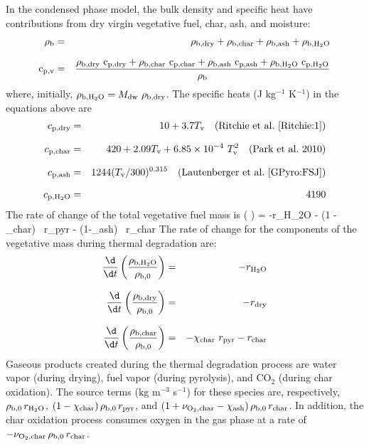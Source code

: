 \documentclass[11pt]{book}
\begin{document}
In the condensed phase model, the bulk density and specific heat have contributions from dry virgin vegetative fuel, char, ash, and moisture:
\begin{eqnarray}
\rho_{\rm b} &=& \rho_{\rm b,dry} + \rho_{\rm b,char} + \rho_{\rm b,ash} + \rho_{\rm b,H_2O} \\[.1in]
{\rm c_{\rm p,v}} &=& \frac{\rho_{\rm b,dry}\ {\rm c_{p,dry}} + \rho_{\rm b,char}\ {\rm c_{p,char}} + \rho_{\rm b,ash}\ {\rm c_{p,ash}} + \rho_{\rm b,H_2O}\ {\rm c_{p,H_2O}}}{\rho_{\rm b}}
\end{eqnarray}
where, initially, $\rho_{\rm b,H_2O} = M_{\rm dw}\ \rho_{\rm b, dry}$. The specific heats (J kg$^{-1}$ K$^{-1}$) in the equations above are
\begin{eqnarray}
c_{\rm p, dry} &=& 10 + 3.7T_{\rm v}~~~ ({\rm Ritchie~et~al.~\cite{Ritchie:1}})  \\[.1in]
c_{\rm p, char} &=& 420 + 2.09 T_{\rm v} + 6.85 \times 10^{-4}\ T^2_{\rm v} ~~~({\rm Park~et~al.~ 2010}) \\[.1in]
c_{\rm p, ash} &=& 1244 (T_{\rm v} / 300)^{0.315}~~~({\rm Lautenberger~et~al.~\cite{GPyro:FSJ}}) \\[.1in]
c_{\rm p,H_2O} &=& 4190
\end{eqnarray}
The rate of change of the total vegetative fuel mass is
\be
{} \left(  \right) = -r_{\rm H_2O} - (1 - \chi_{\rm char}) \, r_{\rm pyr} - (1-\chi_{\rm ash}) \, r_{\rm char}
\ee
The rate of change for the components of the vegetative mass during thermal degradation are:
\begin{eqnarray}
\frac{\d}{\d t} \left( \frac{\rho_{\rm b,H_2O}}{\rho_{\rm b,0}} \right) &=& -r_{\rm H_2O} \\[.1in]
\frac{\d}{\d t} \left( \frac{\rho_{\rm b,dry}}{\rho_{\rm b,0}} \right) &=& -r_{\rm dry}  \\[.1in]
\frac{\d}{\d t} \left( \frac{\rho_{\rm b,char}}{\rho_{\rm b,0}} \right) &=& -\chi_{\rm char}\ r_{\rm pyr} - r_{\rm char}
\end{eqnarray}
Gaseous products created during the thermal degradation process are water vapor (during drying), fuel vapor (during pyrolysis), and CO$_2$ (during char oxidation). The source terms (kg m$^{-3}$ s$^{-1}$) for these species are, respectively, $\rho_{\rm b,0} \, r_{\rm H_2O}$, $(1-\chi_{\rm char}) \, \rho_{\rm b,0} \, r_{\rm pyr}$, and  $(1+\nu_{\rm O_2,char} - \chi_{\rm ash}) \, \rho_{\rm b,0} \, r_{\rm char}$. In addition, the char oxidation process consumes oxygen in the gas phase at a rate of $-\nu_{\rm O_2,char} \, \rho_{\rm b,0} \, r_{\rm char}$.
\end{document}
